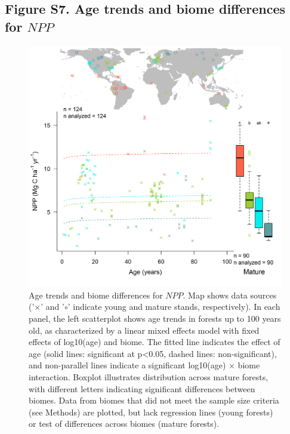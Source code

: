 \documentclass[
]{article}
\begin{document}
\newpage

\hypertarget{figure-s7.-age-trends-and-biome-differences-for-npp}{%
\subsection{\texorpdfstring{Figure S7. Age trends and biome differences
for
\(NPP\)}{Figure S7. Age trends and biome differences for NPP}}\label{figure-s7.-age-trends-and-biome-differences-for-npp}}

\begin{figure}[H]

{\centering \includegraphics[width=1\linewidth]{tables_figures/age_trends/NPP_with_map} 

}

\caption{Age trends and biome differences for $NPP$. Map shows data sources ('$\times$' and '$\circ$' indicate young and mature stands, respectively). In each panel, the left scatterplot shows age trends in forests up to 100 years old, as characterized by a linear mixed effects model with fixed effects of log10(age) and biome. The fitted line indicates the effect of age (solid lines: significant at p<0.05, dashed lines: non-significant), and non-parallel lines indicate a significant log10(age) $\times$ biome interaction. Boxplot illustrates distribution across mature forests, with different letters indicating significant differences between biomes. Data from biomes that did not meet the sample size criteria (see Methods) are plotted, but lack regression lines (young forests) or test of differences across biomes (mature forests).}\label{fig:unnamed-chunk-10}
\end{figure}
\end{document}
